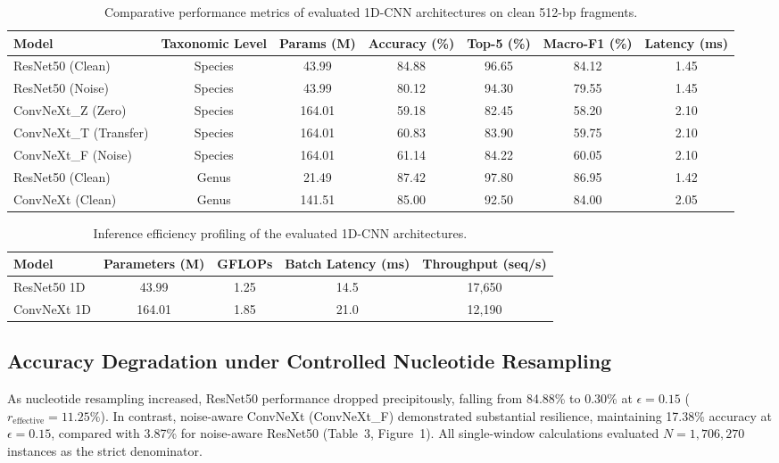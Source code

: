 \documentclass[11pt,a4paper]{article}
\begin{document}
\begin{table}[h!]
\centering
\small
\caption{Comparative performance metrics of evaluated 1D-CNN architectures on clean 512-bp fragments.}
\begin{tabular}{lcccccc}
\toprule
\textbf{Model} & \textbf{Taxonomic Level} & \textbf{Params (M)} & \textbf{Accuracy (\%)} & \textbf{Top-5 (\%)} & \textbf{Macro-F1 (\%)} & \textbf{Latency (ms)} \\
\midrule
ResNet50 (Clean) & Species & 43.99 & 84.88 & 96.65 & 84.12 & 1.45 \\
ResNet50 (Noise) & Species & 43.99 & 80.12 & 94.30 & 79.55 & 1.45 \\
ConvNeXt\_Z (Zero) & Species & 164.01 & 59.18 & 82.45 & 58.20 & 2.10 \\
ConvNeXt\_T (Transfer) & Species & 164.01 & 60.83 & 83.90 & 59.75 & 2.10 \\
ConvNeXt\_F (Noise) & Species & 164.01 & 61.14 & 84.22 & 60.05 & 2.10 \\
ResNet50 (Clean) & Genus & 21.49 & 87.42 & 97.80 & 86.95 & 1.42 \\
ConvNeXt (Clean) & Genus & 141.51 & 85.00 & 92.50 & 84.00 & 2.05 \\
\bottomrule
\end{tabular}
\end{table}

\begin{table}[h!]
\centering
\small
\caption{Inference efficiency profiling of the evaluated 1D-CNN architectures.}
\begin{tabular}{lcccc}
\toprule
\textbf{Model} & \textbf{Parameters (M)} & \textbf{GFLOPs} & \textbf{Batch Latency (ms)} & \textbf{Throughput (seq/s)} \\
\midrule
ResNet50 1D & 43.99 & 1.25 & 14.5 & 17,650 \\
ConvNeXt 1D & 164.01 & 1.85 & 21.0 & 12,190 \\
\bottomrule
\end{tabular}
\end{table}

\subsection{Accuracy Degradation under Controlled Nucleotide Resampling}
As nucleotide resampling increased, ResNet50 performance dropped precipitously, falling from 84.88\% to 0.30\% at $\epsilon=0.15$ ($r_{\text{effective}} = 11.25\%$). In contrast, noise-aware ConvNeXt (ConvNeXt\_F) demonstrated substantial resilience, maintaining 17.38\% accuracy at $\epsilon=0.15$, compared with 3.87\% for noise-aware ResNet50 (Table~3, Figure~1). All single-window calculations evaluated $N=1,706,270$ instances as the strict denominator.
\end{document}
